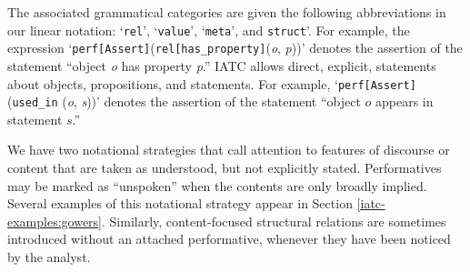 \documentclass[smallextended,oneside]{svjour3}       %
\newcommand\nothing[1]{#1}
\let\paragraph\nothing
\begin{document}
\paragraph{The associated grammatical categories are given the following abbreviations in our linear notation: `\texttt{rel}', `\texttt{value}', `\texttt{meta}', and \texttt{struct}'.}  For example, the expression
`\texttt{perf[Assert]}(\texttt{rel[has\_property]}(\emph{o},
\emph{p}))' denotes the assertion of the statement
``object \emph{o} has property \emph{p}.'' 
IATC allows direct, explicit, statements about objects, propositions, and statements.  For example, `\texttt{perf[Assert]}(\texttt{used\_in} (\emph{o}, \emph{s}))' denotes the assertion of the statement ``object $o$ appears in statement $s$.''

We have two notational strategies that call attention to features of discourse or content that are
taken as understood, but not explicitly stated.
Performatives may be marked as ``unspoken'' when the contents are only broadly implied.
Several examples of this notational strategy appear
in Section \ref{iatc-examples:gowers}.
Similarly, content-focused structural relations are sometimes introduced without an attached performative, whenever they have been noticed by the analyst.

\end{document}
